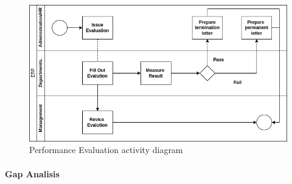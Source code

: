 \begin{figure}[!h]
\label{loan_activity_diagram}
\center
\includegraphics[width=15cm,keepaspectratio]{activity_diagrams/appraisal_activity_diagram.drawio.png}
\caption{Performance Evaluation activity diagram}
\end{figure}


\paragraph{Gap Analisis}
